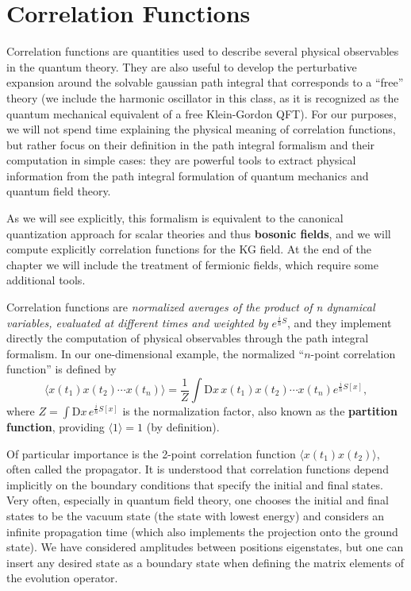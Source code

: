 \section{Correlation Functions}

Correlation functions are quantities used to describe several physical observables in the quantum theory. They are also useful to develop the perturbative expansion around the solvable gaussian path integral that corresponds to a “free” theory (we include the harmonic oscillator in this class, as it is recognized as the quantum mechanical equivalent of a free Klein-Gordon QFT).
For our purposes, we will not spend time explaining the physical meaning of correlation functions, but rather focus on their definition in the path integral formalism and their computation in simple cases: they are powerful tools to extract physical information from the path integral formulation of quantum mechanics and quantum field theory.

As we will see explicitly, this formalism is equivalent to the canonical quantization approach for scalar theories and thus \textbf{bosonic fields}, and we will compute explicitly correlation functions for the KG field. At the end of the chapter we will include the treatment of fermionic fields, which require some additional tools.

Correlation functions are \textit{normalized averages of the product of n dynamical variables, evaluated at different times and weighted by} \(e^{\frac{i}{\hbar}S}\), and they implement directly the computation of physical observables through the path integral formalism. In our one-dimensional example, the normalized “\(n\)-point correlation function” is defined by
\begin{equation}
    \langle x(t_1)x(t_2)\cdots x(t_n) \rangle = \frac{1}{Z} \int \mathrm{D} x \, x(t_1)x(t_2)\cdots x(t_n) e^{\frac{i}{\hbar}S[x]},
    \label{eq:n_point_correlation_function}
\end{equation}
where \(Z = \int \mathrm{D} x \, e^{\frac{i}{\hbar}S[x]}\) is the normalization factor, also known as the \textbf{partition function}, providing \(\langle 1 \rangle = 1\) (by definition).

Of particular importance is the 2-point correlation function \(\langle x(t_1) x(t_2) \rangle\), often called the propagator. It is understood that correlation functions depend implicitly on the boundary conditions that specify the initial and final states. Very often, especially in quantum field theory, one chooses the initial and final states to be the vacuum state (the state with lowest energy) and considers an infinite propagation time (which also implements the projection onto the ground state). We have considered amplitudes between positions eigenstates, but one can insert any desired state as a boundary state when defining the matrix elements of the evolution operator.


